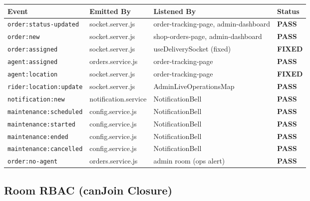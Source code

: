 \documentclass[11pt,a4paper]{article}
\newcommand{\PASS}{\colorbox{successgreen!20}{\color{successgreen}\bfseries\small PASS}}
\newcommand{\FIXED}{\colorbox{successgreen!20}{\color{successgreen}\bfseries\small FIXED}}
\begin{document}
\begin{longtable}{@{}p{4.5cm}p{3.5cm}p{3.5cm}p{2cm}@{}}
\toprule
\rowcolor{navyblue}
\color{white}\bfseries Event & \color{white}\bfseries Emitted By & \color{white}\bfseries Listened By & \color{white}\bfseries Status \\
\midrule
\endfirsthead
\midrule\endhead\bottomrule\endfoot
\texttt{order:status-updated}  & socket.server.js       & order-tracking-page, admin-dashboard & \PASS \\
\rowcolor{rowalt}
\texttt{order:new}             & socket.server.js       & shop-orders-page, admin-dashboard & \PASS \\
\texttt{order:assigned}        & socket.server.js       & useDeliverySocket (fixed) & \FIXED \\
\rowcolor{rowalt}
\texttt{agent:assigned}        & orders.service.js      & order-tracking-page & \PASS \\
\texttt{agent:location}        & socket.server.js       & order-tracking-page & \FIXED \\
\rowcolor{rowalt}
\texttt{rider:location:update} & socket.server.js       & AdminLiveOperationsMap & \PASS \\
\texttt{notification:new}      & notification.service   & NotificationBell & \PASS \\
\rowcolor{rowalt}
\texttt{maintenance:scheduled} & config.service.js      & NotificationBell & \PASS \\
\texttt{maintenance:started}   & config.service.js      & NotificationBell & \PASS \\
\rowcolor{rowalt}
\texttt{maintenance:ended}     & config.service.js      & NotificationBell & \PASS \\
\texttt{maintenance:cancelled} & config.service.js      & NotificationBell & \PASS \\
\rowcolor{rowalt}
\texttt{order:no-agent}        & orders.service.js      & admin room (ops alert) & \PASS \\
\end{longtable}

\subsection{Room RBAC (canJoin Closure)}
\end{document}
